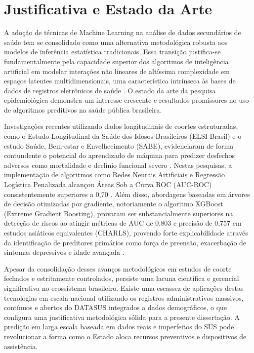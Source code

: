 \documentclass[12pt,openright,oneside,a4paper,brazil]{abntex2}
\begin{document}
\section{Justificativa e Estado da Arte}
A adoção de técnicas de Machine Learning na análise de dados secundários de saúde tem se consolidado como uma alternativa metodológica robusta aos modelos de inferência estatística tradicionais. Essa transição justifica-se fundamentalmente pela capacidade superior dos algoritmos de inteligência artificial em modelar interações não lineares de altíssima complexidade em espaços latentes multidimensionais, uma característica intrínseca às bases de dados de registros eletrônicos de saúde \cite{ref12, ref13}. O estado da arte da pesquisa epidemiológica demonstra um interesse crescente e resultados promissores no uso de algoritmos preditivos na saúde pública brasileira. 

Investigações recentes utilizando dados longitudinais de coortes estruturadas, como o Estudo Longitudinal da Saúde dos Idosos Brasileiros (ELSI-Brasil) e o estudo Saúde, Bem-estar e Envelhecimento (SABE), evidenciaram de forma contundente o potencial do aprendizado de máquina para predizer desfechos adversos como mortalidade e declínio funcional severo \cite{ref10, ref14, ref15}. Nestas pesquisas, a implementação de algoritmos como Redes Neurais Artificiais e Regressão Logística Penalizada alcançou Áreas Sob a Curva ROC (AUC-ROC) consistentemente superiores a 0,70 \cite{ref10}. Além disso, abordagens baseadas em árvores de decisão otimizadas por gradiente, notoriamente o algoritmo XGBoost (Extreme Gradient Boosting), provaram ser substancialmente superiores na detecção de riscos ao atingir métricas de AUC de 0,803 e precisão de 0,757 em estudos asiáticos equivalentes (CHARLS), provendo forte explicabilidade através da identificação de preditores primários como força de preensão, exacerbação de sintomas depressivos e idade avançada \cite{ref11}. 

Apesar da consolidação desses avanços metodológicos em estudos de coorte fechados e estritamente controlados, persiste uma lacuna científica e gerencial significativa no ecossistema brasileiro. Existe uma escassez de aplicações destas tecnologias em escala nacional utilizando os registros administrativos massivos, contínuos e abertos do DATASUS integrados a dados demográficos, o que configura uma justificativa metodológica sólida para a presente dissertação. A predição em larga escala baseada em dados reais e imperfeitos do SUS pode revolucionar a forma como o Estado aloca recursos preventivos e dispositivos de assistência.
\end{document}
